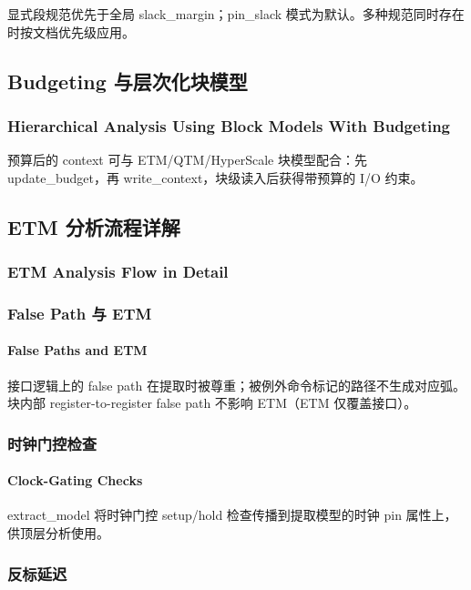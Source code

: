 显式段规范优先于全局 slack_margin；pin_slack 模式为默认。多种规范同时存在时按文档优先级应用。

\subsection{Budgeting 与层次化块模型}
\subsubsection*{Hierarchical Analysis Using Block Models With Budgeting}

预算后的 context 可与 ETM/QTM/HyperScale 块模型配合：先 update_budget，再 write_context，块级读入后获得带预算的 I/O 约束。

\subsection{ETM 分析流程详解}
\subsubsection*{ETM Analysis Flow in Detail}


\subsubsection{False Path 与 ETM}
\paragraph*{False Paths and ETM}

接口逻辑上的 false path 在提取时被尊重；被例外命令标记的路径不生成对应弧。块内部 register-to-register false path 不影响 ETM（ETM 仅覆盖接口）。

\subsubsection{时钟门控检查}
\paragraph*{Clock-Gating Checks}

extract_model 将时钟门控 setup/hold 检查传播到提取模型的时钟 pin 属性上，供顶层分析使用。

\subsubsection{反标延迟}
